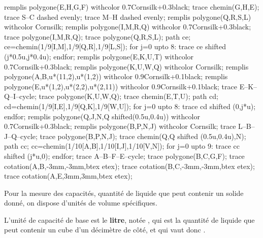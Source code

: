 \begin{remarque}
\begin{minipage}{0.4\linewidth}
\begin{center}
\begin{Geometrie}[CoinBG={(-0.5u,-0.5u)}]
                remplis polygone(E,H,G,F) withcolor 0.7Cornsilk+0.3black;
                trace chemin(G,H,E);
                trace S--C dashed evenly;
                trace M--H dashed evenly;
                remplis polygone(Q,R,S,L) withcolor Cornsilk;
                remplis polygone(I,M,R,Q) withcolor 0.7Cornsilk+0.3black;
                trace polygone(I,M,R,Q);
                trace polygone(Q,R,S,L);
                path ce;
                ce=chemin(1/9[I,M],1/9[Q,R],1/9[L,S]);
                for j=0 upto 8:
                trace ce shifted (j*0.5u,j*0.4u);
                endfor;
                remplis polygone(E,K,U,T) withcolor 0.7Cornsilk+0.3black;
                remplis polygone(K,U,W,Q) withcolor Cornsilk;
                remplis polygone(A,B,u*(11,2),u*(1,2)) withcolor 0.9Cornsilk+0.1black;
                remplis polygone(E,u*(1,2),u*(2,2),u*(2,11)) withcolor 0.9Cornsilk+0.1black;
                trace E--K--Q--I--cycle;
                trace polygone(K,U,W,Q);
                trace chemin(E,T,U);
                path cd;
                cd=chemin(1/9[I,E],1/9[Q,K],1/9[W,U]);
                for j=0 upto 8:
                trace cd shifted (0,j*u);
                endfor;
                remplis polygone(Q,J,N,Q shifted(0.5u,0.4u)) withcolor 0.7Cornsilk+0.3black;
                remplis polygone(B,P,N,J) withcolor Cornsilk;
                trace L--B--J--Q--cycle;
                trace polygone(B,P,N,J);
                trace chemin(Q,Q shifted (0.5u,0.4u),N);
                path cc;
                cc=chemin(1/10[A,B],1/10[I,J],1/10[V,N]);
                for j=0 upto 9:
                trace cc shifted (j*u,0);
                endfor;
                trace A--B--F--E--cycle;
                trace polygone(B,C,G,F);
                trace cotation(A,B,-3mm,-3mm,btex  etex);
                trace cotation(B,C,-3mm,-3mm,btex  etex);
                trace cotation(A,E,3mm,3mm,btex  etex);
            \end{Geometrie}
        \end{center}
    \end{minipage}
\end{remarque}

\begin{definition}
    Pour la mesure des capacités, quantité de liquide que peut contenir un solide donné, on dispose d'unités de volume spécifiques.
    
    L'unité de capacité de base est le \textbf{litre}, notée \Capa[L]{}, qui est la quantité de liquide que peut contenir un cube d'un décimètre de côté, et qui vaut donc .
\end{definition}

